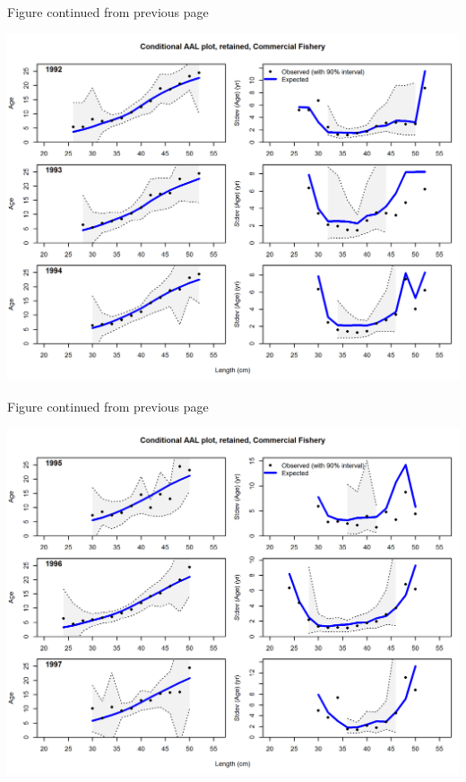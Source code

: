 \documentclass[12pt,]{article}
\begin{document}
\begin{center} 

            Figure continued from previous page 

            \end{center}

\includegraphics{./r4ss/plots_mod2/comp_condAALfit_Andre_plotsflt2mkt2_page5.png}

\begin{center} 

            Figure continued from previous page 

            \end{center}

\includegraphics{./r4ss/plots_mod2/comp_condAALfit_Andre_plotsflt2mkt2_page6.png}
\end{document}
